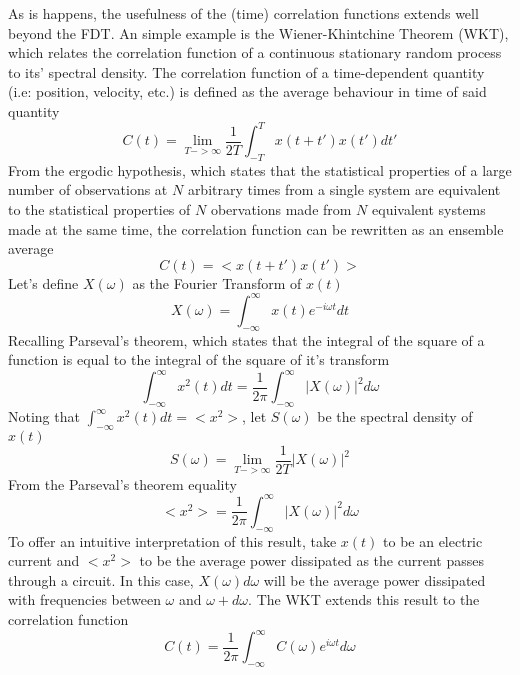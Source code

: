 \documentclass[aps,prb,preprint,preprintnumbers,amsmath,amssymb,floatfix,superscriptaddress]{revtex4}
\begin{document}
As is happens, the usefulness of the (time) correlation functions extends well beyond the FDT. An simple example is the Wiener-Khintchine Theorem (WKT), which relates the correlation function of a continuous stationary random process to its' spectral density. The correlation function of a time-dependent quantity (i.e: position, velocity, etc.) is defined as the average behaviour in time of said quantity \cite{mcquarrie}
%
\begin{equation}
C(t)=\lim_{T->\infty}\frac{1}{2T}\int_{-T}^{T}x(t+t')x(t')dt'
\end{equation}
%
From the ergodic hypothesis, which states that the statistical properties of a large number of observations at $N$ arbitrary times from a single system are equivalent to the statistical properties of $N$ obervations made from $N$ equivalent systems made at the same time, the correlation function can be rewritten as an ensemble average
%
\begin{equation}
C(t)=<x(t+t')x(t')>
\end{equation}
%
Let's define $X(\omega)$ as the Fourier Transform of $x(t)$
%
\begin{equation}
X(\omega)=\int_{-\infty}^{\infty}x(t)e^{-i\omega t}dt
\end{equation}
%
Recalling Parseval's theorem, which states that the integral of the square of a function is equal to the integral of the square of it's transform
%
\begin{equation}
\int_{-\infty}^{\infty}x^2(t)dt=\frac{1}{2\pi}\int_{-\infty}^{\infty}|X(\omega)|^2d\omega
\end{equation}
%
Noting that $\int_{-\infty}^{\infty}x^2(t)dt=<x^2>$, let $S(\omega)$ be the spectral density of $x(t)$
%
\begin{equation}
S(\omega)=\lim_{T->\infty}\frac{1}{2T}|X(\omega)|^2
\end{equation}
%
From the Parseval's theorem equality
%
\begin{equation}
<x^2>=\frac{1}{2\pi}\int_{-\infty}^{\infty}|X(\omega)|^2d\omega
\end{equation}
%
To offer an intuitive interpretation of this result, take $x(t)$ to be an electric current and $<x^2>$ to be the average power dissipated as the current passes through a circuit. In this case, $X(\omega)d\omega$ will be the average power dissipated with frequencies between $\omega$ and $\omega+d\omega$. The WKT extends this result to the correlation function
%
\begin{equation}
C(t)=\frac{1}{2\pi}\int_{-\infty}^{\infty}C(\omega)e^{i\omega t}d\omega
\end{equation}
\end{document}
